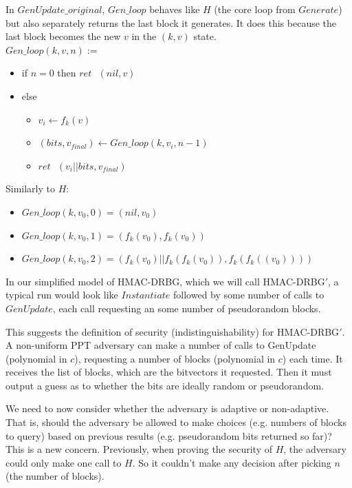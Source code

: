 \documentclass[12pt,lot, lof]{puthesis}
\newenvironment{game}
{ \begin{itemize}[noitemsep,nolistsep] 
}
{ \end{itemize}                  }
\newcommand{\s} {\textrm{ }}
\newcommand{\lar}{\leftarrow}
\begin{document}
In $GenUpdate\_original$, $Gen\_loop$ behaves like $H$ (the core loop from $Generate$) but also separately returns the last block it generates. It does this because the last block becomes the new $v$ in the $(k,v)$ state.\\ 

$Gen\_loop(k, v, n) :=$
\begin{game}
\item[] if $n = 0$ then $ret \s (nil, v)$
\item[] else
  \begin{game}
    \item[] $v_i \lar f_k(v)$
    \item[] $(bits, v_{final}) \lar Gen\_loop(k, v_i, n-1)$
    \item[] $ret \s (v_i || bits, v_{final})$\\
  \end{game}
\end{game}

Similarly to $H$:\\
\begin{game}
  \item[] $Gen\_loop(k, v_0, 0) = (nil, v_0)$
  \item[] $Gen\_loop(k, v_0, 1) = (f_k(v_0), f_k(v_0))$
  \item[] $Gen\_loop(k, v_0, 2) = (f_k(v_0) || f_k(f_k(v_0)), f_k(f_k((v_0))))$\\
\end{game}

In our simplified model of HMAC-DRBG, which we will call HMAC-DRBG$'$, a typical run would look like $Instantiate$ followed by some number of calls to $GenUpdate$, each call requesting an some number of pseudorandom blocks.

This suggests the definition of security (indistinguishability) for HMAC-DRBG$'$. A non-uniform PPT adversary can make a number of calls to GenUpdate (polynomial in $c$), requesting a number of blocks (polynomial in $c$) each time. It receives the list of blocks, which are the bitvectors it requested. Then it must output a guess as to whether the bits are ideally random or pseudorandom.

We need to now consider whether the adversary is adaptive or non-adaptive. That is, should the adversary be allowed to make choices (e.g. numbers of blocks to query) based on previous results (e.g. pseudorandom bits returned so far)? This is a new concern. Previously, when proving the security of $H$, the adversary could only make one call to $H$. So it couldn't make any decision after picking $n$ (the number of blocks). 
\end{document}
